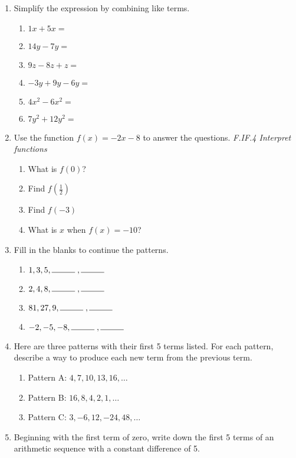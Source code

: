\documentclass[12pt, twoside]{article}
\begin{document}
\begin{enumerate}[itemsep=0.5cm]
\item Simplify the expression by combining like terms.
    \begin{multicols}{2}
    \begin{enumerate}[itemsep=0.5cm]
        \item $1x + 5x =$
        \item $14y - 7y =$
        \item $9z - 8z + z =$
        \item $-3y + 9y - 6y =$
        \item $4x^2 - 6x^2 =$
        \item $7y^2 + 12y^2 =$
    \end{enumerate}
    \end{multicols}

\newpage
\item Use the function $f(x) = -2x-8$ to answer the questions. \hfill \emph{F.IF.4 Interpret functions}
\begin{enumerate}[itemsep=1cm]
    \item What is $f(0)$?
    \item Find $f(\frac{1}{2})$
    \item Find $f(-3)$
    \item What is $x$ when $f(x) = -10$?
\end{enumerate}\vspace{2cm}

\item Fill in the blanks to continue the patterns.\vspace{0.5cm}
\begin{multicols}{2}
\begin{enumerate}[itemsep=1cm]
    \item $1, 3, 5, \rule{1cm}{0.15mm} \;, \rule{1cm}{0.15mm}$
    \item $2, 4, 8, \rule{1cm}{0.15mm} \;, \rule{1cm}{0.15mm}$
    \item $81, 27, 9, \rule{1cm}{0.15mm} \;, \rule{1cm}{0.15mm}$
    \item $-2, -5, -8, \rule{1cm}{0.15mm} \;, \rule{1cm}{0.15mm}$
\end{enumerate}
\end{multicols}

\item Here are three patterns with their first 5 terms listed. For each pattern, describe a way to produce each new term from the previous term.
\begin{enumerate}[itemsep=1cm]
    \item Pattern A: $4, 7, 10, 13, 16, \dots$
    \item Pattern B: $16, 8, 4, 2, 1, \dots$
    \item Pattern C: $3, -6, 12, -24, 48, \dots$
\end{enumerate}

\item Beginning with the first term of zero, write down the first 5 terms of an arithmetic sequence with a constant difference of 5.

\end{enumerate}
\end{document}
